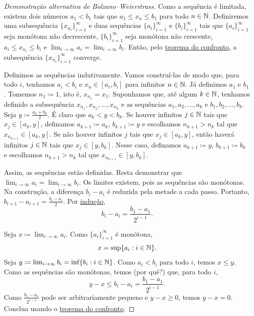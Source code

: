 \begin{proof}[Demonstração alternativa de Bolzano--Weierstrass]
Como a sequência é limitada, existem dois números $a_1 < b_1$
tais que $a_1 \leq x_n \leq b_1$ para todo $n \in {\mathbb{N}}$.
Definiremos uma subsequência $\{ x_{n_i} \}_{i=1}^\infty$ e duas
sequências $\{ a_i \}_{i=1}^\infty$ e $\{ b_i \}_{i=1}^\infty$ tais que
$\{ a_i \}_{i=1}^\infty$ seja monótona não decrescente, $\{ b_i \}_{i=1}^\infty$ seja monótona não crescente,
$a_i \leq x_{n_i} \leq b_i$ e $\lim_{i\to\infty} a_i =
\lim_{i\to\infty} b_i$. Então, pelo
\hyperref[squeeze:lemma]{teorema do confronto}, a subsequência
$\{ x_{n_i} \}_{i=1}^\infty$ converge.

Definimos as sequências indutivamente. Vamos construí-las de modo que,
para todo $i$, tenhamos $a_i < b_i$
e $x_n \in [a_i,b_i]$ para infinitos $n \in {\mathbb{N}}$.
Já definimos $a_1$ e $b_1$. Tomemos $n_1 \coloneqq 1$, isto é,
$x_{n_1} = x_1$.
Suponhamos que, até algum $k \in {\mathbb{N}}$,
tenhamos definido a subsequência $x_{n_1}, x_{n_2}, \ldots,
x_{n_k}$ e as sequências $a_1,a_2,\ldots,a_k$
e $b_1,b_2,\ldots,b_k$.
Seja $y \coloneqq \frac{a_k+b_k}{2}$.
É claro que
$a_k < y < b_k$. Se houver infinitos $j \in {\mathbb{N}}$
tais que $x_j \in [a_k,y]$, definamos $a_{k+1} \coloneqq a_k$, $b_{k+1}
\coloneqq y$
e escolhamos $n_{k+1} > n_{k}$
tal que $x_{n_{k+1}} \in [a_k,y]$. Se não houver infinitos
$j$ tais que
$x_j \in [a_k,y]$, então haverá infinitos $j \in
{\mathbb{N}}$ tais que
$x_j \in [y,b_k]$. Nesse caso, definamos $a_{k+1} \coloneqq y$, $b_{k+1}
\coloneqq b_k$
e escolhamos $n_{k+1} > n_{k}$
tal que $x_{n_{k+1}} \in [y,b_k]$.

Assim, as sequências estão definidas. Resta demonstrar que
$\lim_{i\to\infty} a_i = \lim_{i\to\infty} b_i$. Os limites existem, pois as sequências
são monótonas. Na construção,
a diferença $b_i - a_i$ é reduzida pela metade a cada passo. Portanto,
$b_{i+1} - a_{i+1} = \frac{b_i-a_i}{2}$. Por
\hyperref[induction:thm]{indução},
\begin{equation*}
b_i - a_i = \frac{b_1-a_1}{2^{i-1}} .
\end{equation*}

Seja $x \coloneqq \lim_{i\to\infty} a_i$. Como $\{ a_i \}_{i=1}^\infty$ é monótona,
\begin{equation*}
x = \sup \{ a_i : i \in {\mathbb{N}} \} .
\end{equation*}
Seja $y \coloneqq \lim_{i\to\infty} b_i = \inf \{ b_i : i \in {\mathbb{N}} \}$. Como $a_i < b_i$ para
todo $i$, temos $x \leq y$.
Como as sequências são monótonas, temos (por quê?) que, para todo $i$,
\begin{equation*}
y-x \leq b_i-a_i = \frac{b_1-a_1}{2^{i-1}} .
\end{equation*}
Como $\frac{b_1-a_1}{2^{i-1}}$ pode ser arbitrariamente pequeno e $y-x \geq 0$,
temos $y-x = 0$. Conclua usando o \hyperref[squeeze:lemma]{teorema do confronto}.
\end{proof}


